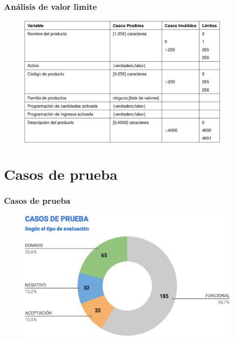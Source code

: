 \documentclass{beamer}
\begin{document}
\begin{frame}
\frametitle{Análisis de valor limite}
\begin{figure}
\centering
\includegraphics[width=0.95\textwidth]{graphics/figure1.eps}
\end{figure}
\end{frame}

\section{Casos de prueba}

\begin{frame}
\frametitle{Casos de prueba}
\begin{figure}
\centering
\includegraphics[width=1.0\textwidth]{graphics/tc-tests.eps}
\end{figure}
\end{frame}
\end{document}
